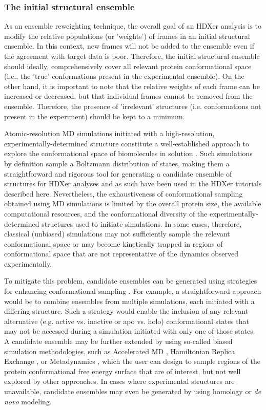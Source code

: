\documentclass[9pt,tutorial,ASAPversion]{livecoms}
\begin{document}
\subsubsection{The initial structural ensemble}\label{initialensemble_sect}
As an ensemble reweighting technique, the overall goal of an HDXer analysis is to modify the relative populations (or 'weights') of frames in an initial structural ensemble.
In this context, new frames will not be added to the ensemble even if the agreement with target data is poor. 
Therefore, the initial structural ensemble should ideally, comprehensively cover all relevant protein conformational space (i.e., the 'true' conformations present in the experimental ensemble).
On the other hand, it is important to note that the relative weights of each frame can be increased or decreased, but that individual frames cannot be removed from the ensemble. 
Therefore, the presence of 'irrelevant' structures (i.e. conformations not present in the experiment) should be kept to a minimum.

Atomic-resolution MD simulations initiated with a high-resolution, experimentally-determined structure constitute a well-established approach to explore the conformational space of biomolecules in solution \cite{Huggins2019}. 
Such simulations by definition sample a Boltzmann distribution of states, making them a straightforward and rigorous tool for generating a candidate ensemble of structures for HDXer analyses and as such have been used in the HDXer tutorials described here.
Nevertheless, the exhaustiveness of conformational sampling obtained using MD simulations is limited by the overall protein size, the available computational resources, and the conformational diversity of the experimentally-determined structures used to initiate simulations.
In some cases, therefore, classical (unbiased) simulations may not sufficiently sample the relevant conformational space or may become kinetically trapped in regions of conformational space that are not representative of the dynamics observed experimentally.

To mitigate this problem, candidate ensembles can be generated using strategies for enhancing conformational sampling \cite{Allison2020}.
For example, a straightforward approach would be to combine ensembles from multiple simulations, each initiated with a differing structure.
Such a strategy would enable the inclusion of any relevant alternative (e.g. active vs. inactive or apo vs. holo) conformational states that may not be accessed during a simulation initiated with only one of those states.
A candidate ensemble may be further extended by using so-called biased simulation methodologies, such as Accelerated MD \cite{Hamelberg2004}, Hamiltonian Replica Exchange \cite{Fukunishi2002}, or Metadynamics \cite{Laio2002}, which the user can design to sample regions of the protein conformational free energy surface that are of interest, but not well explored by other approaches.
In cases where experimental structures are unavailable, candidate ensembles may even be generated by using homology or \textit{de novo} modeling.
\end{document}
